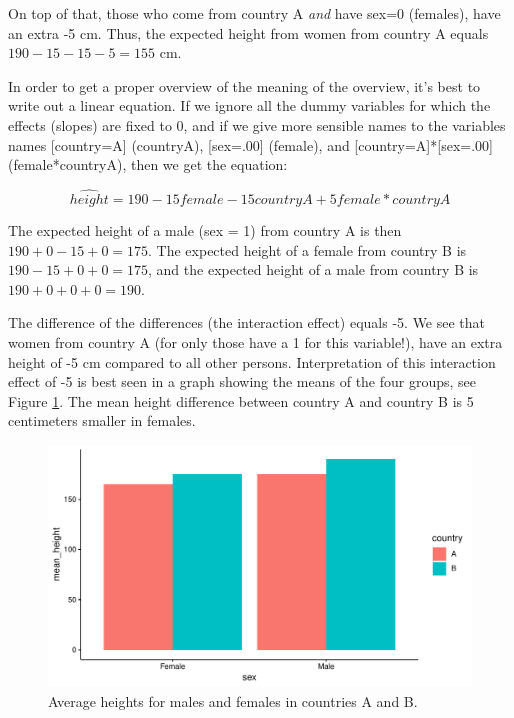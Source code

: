 \documentclass[]{book}\usepackage[]{graphicx}\usepackage[]{color}
\makeatletter
\def\maxwidth{ %
  \ifdim\Gin@nat@width>\linewidth
    \linewidth
  \else
    \Gin@nat@width
  \fi
}
\newenvironment{knitrout}{}{} %
\makeatother
\begin{document}
On top of that, those who come from country A \textit{and} have sex=0 (females), have an extra -5 cm. Thus, the expected height from women from country A equals $190-15-15-5=155$ cm. 

In order to get a proper overview of the meaning of the overview, it's best to write out a linear equation. If we ignore all the dummy variables for which the effects (slopes) are fixed to 0, and if we give more sensible names to the variables names [country=A] (countryA), [sex=.00] (female), and [country=A]*[sex=.00] (female*countryA), then we get the equation:

\begin{equation}
\widehat{height}= 190  - 15 female - 15 countryA + 5 female*countryA
\end{equation}


The expected height of a male (sex = 1) from country A is then $190  + 0 - 15 + 0 = 175$. The expected height of a female from country B is $190 -15 + 0 +0 =175$, and the expected height of a male from country B is $190 + 0 + 0 + 0 = 190$. 

The difference of the differences (the interaction effect) equals -5. We see that women from country A (for only those have a 1 for this variable!), have an extra height of -5 cm compared to all other persons. Interpretation of this interaction effect of -5 is best seen in a graph showing the means of the four groups, see Figure \ref{fig:country_sex1}. The mean height difference between country A and country B is 5 centimeters smaller in females.

\begin{knitrout}
\color{fgcolor}\begin{figure}

{\centering \includegraphics[width=\maxwidth]{figure/country_sex1-1} 

}

\caption[Average heights for males and females in countries A and B]{Average heights for males and females in countries A and B.}\label{fig:country_sex1}
\end{figure}


\end{knitrout}
\end{document}

